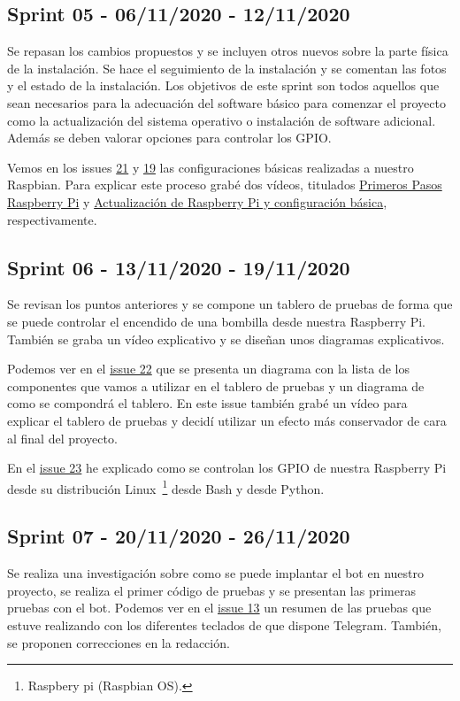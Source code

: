 \subsection{Sprint 05 - 06/11/2020 - 12/11/2020}
Se repasan los cambios propuestos y se incluyen otros nuevos sobre la parte física de la instalación. Se hace el seguimiento de la instalación y se comentan las fotos y el estado de la instalación.
Los objetivos de este sprint son todos aquellos que sean necesarios para la adecuación del software básico para comenzar el proyecto como la actualización del sistema operativo o instalación de software adicional. Además se deben valorar opciones para controlar los GPIO.

Vemos en los issues \href{https://github.com/davidelinformatico/TFG/issues/21}{21} y \href{https://github.com/davidelinformatico/TFG/issues/19}{19} las configuraciones básicas realizadas a nuestro Raspbian. Para explicar este proceso grabé dos vídeos, titulados \href{https://youtu.be/B8E6q1fLp7Q}{Primeros Pasos Raspberry Pi} y \href{https://youtu.be/Vz38sGYpcYQ}{Actualización de Raspberry Pi y configuración básica}, respectivamente.

\subsection{Sprint 06 - 13/11/2020 - 19/11/2020}
Se revisan los puntos anteriores y se compone un tablero de pruebas de forma que se puede controlar el encendido de una bombilla desde nuestra Raspberry Pi. También se graba un vídeo explicativo y se diseñan unos diagramas explicativos.

Podemos ver en el \href{https://github.com/davidelinformatico/TFG/issues/22}{issue 22} que se presenta un diagrama con la lista de los componentes que vamos a utilizar en el tablero de pruebas y un diagrama de como se compondrá el tablero. En este issue también grabé un vídeo para explicar el tablero de pruebas y decidí utilizar un efecto más conservador de cara al final del proyecto.

En el \href{https://github.com/davidelinformatico/TFG/issues/23}{issue 23} he explicado como se controlan los GPIO de nuestra Raspberry Pi desde su distribución Linux~\footnote{Raspbery pi (Raspbian OS).} desde Bash y desde Python.

\subsection{Sprint 07 - 20/11/2020 - 26/11/2020}
Se realiza una investigación sobre como se puede implantar el bot en nuestro proyecto, se realiza el primer código de pruebas y se presentan las primeras pruebas con el bot. Podemos ver en el \href{https://github.com/davidelinformatico/TFG/issues/13}{issue 13} un resumen de las pruebas que estuve realizando con los diferentes teclados de que dispone Telegram.
También, se proponen correcciones en la redacción.

